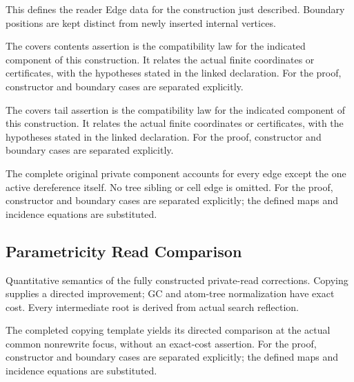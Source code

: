 This defines the reader Edge data for the construction just described. Boundary positions are kept distinct from newly inserted internal vertices.
\par{}

The covers contents assertion is the compatibility law for the indicated component of this construction. It relates the actual finite coordinates or certificates, with the hypotheses stated in the linked declaration.
For the proof, constructor and boundary cases are separated explicitly.
\par{}

The covers tail assertion is the compatibility law for the indicated component of this construction. It relates the actual finite coordinates or certificates, with the hypotheses stated in the linked declaration.
For the proof, constructor and boundary cases are separated explicitly.
\par{}

The complete original private component accounts for every edge except the one active dereference itself. No tree sibling or cell edge is omitted.
For the proof, constructor and boundary cases are separated explicitly; the defined maps and incidence equations are substituted.
\par{}

\subsection{Parametricity Read Comparison}
Quantitative semantics of the fully constructed private-read corrections. Copying supplies a directed improvement; GC and atom-tree normalization have exact cost. Every intermediate root is derived from actual search reflection.

The completed copying template yields its directed comparison at the actual common nonrewrite focus, without an exact-cost assertion.
For the proof, constructor and boundary cases are separated explicitly; the defined maps and incidence equations are substituted.
\par{}

